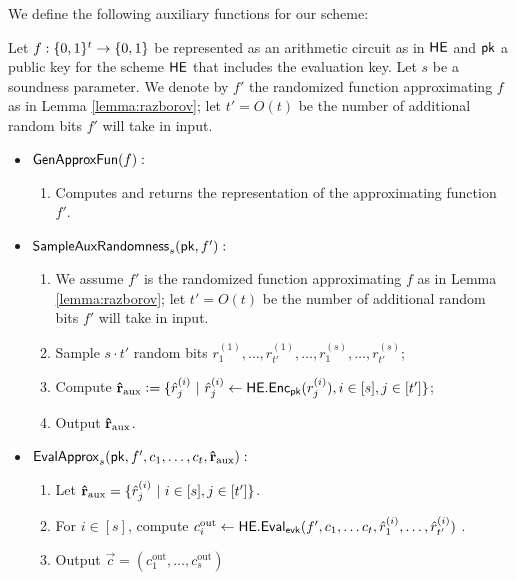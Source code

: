 \def\GenApproxFun{\function{GenApproxFun}}
\def\SampleAuxRandomness{\function{SampleAuxRandomness}}
\def\EvalApprox{\function{EvalApprox}}

We define the following auxiliary functions for our scheme:
\begin{definition}
\label{def:aux-he-fns}
\item Let $f: \{0, 1\}^t \to \{0, 1\}$ be represented as an arithmetic circuit as in $\mathsf{HE}$ and $\mathsf{pk}$ a public key for the scheme $\mathsf{HE}$ that includes the evaluation key. Let $s$ be a soundness parameter.
We denote by  $f'$ the randomized function approximating $f$ as in Lemma \ref{lemma:razborov}; let $t' = O(t)$ be the number of additional random bits $f'$ will take in input.
\begin{itemize}
\item $\GenApproxFun(f):$
\begin{enumerate}
\item Computes and returns the representation of the approximating function $f'$.
\end{enumerate}
\item $\SampleAuxRandomness_s(\pk, f'):$
\begin{enumerate}
\item We assume  $f'$ is the randomized function approximating $f$ as in Lemma \ref{lemma:razborov}; let $t' = O(t)$ be the number of additional random bits $f'$ will take in input.
\item Sample $s\cdot t'$ random bits $r^{(1)}_1,\dots,r^{(1)}_{t'}, \dots, r^{(s)}_1,\dots,r^{(s)}_{t'}$;
\item Compute $\mathbf{\hat{r}}_{\text{aux}} \vcentcolon= \{  \hat{r}^{(i)}_j \ | \ \hat{r}^{(i)}_j \gets \mathsf{HE.Enc}_{\mathsf{pk}}(r^{(i)}_j), i \in [s], j \in [t'] \} $;
\item Output $\mathbf{\hat{r}}_{\text{aux}}$.
\end{enumerate}
\medskip
\item $\EvalApprox_s(\pk, f', c_1,\dots,c_t, \hatraux):$
\begin{enumerate}
\item Let $\mathbf{\hat{r}}_{\text{aux}} = \{  \hat{r}^{(i)}_j \ | \  i \in [s], j \in [t'] \} $.
\item For $i \in [s]$, compute $c^{\text{out}}_i \gets \mathsf{HE.Eval}_{\mathsf{evk}}(f', c_1, \dots c_t, \hat{r}^{(i)}_1, \dots, \hat{r}^{(i)}_{t'})$ .
\item Output $\vec{c} = (c^{\text{out}}_1, \dots, c^{\text{out}}_{s})$
\end{enumerate}

\end{itemize}
\end{definition}

